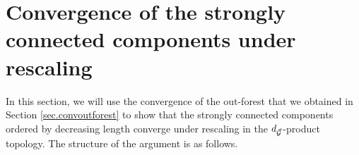 \section{Convergence of the strongly connected components under rescaling}\label{sec.convSCCs}

In this section, we will use the convergence of the out-forest that we obtained in Section \ref{sec.convoutforest} to show that the strongly connected components ordered by decreasing length converge under rescaling in the $d_{\vec{{\mathcal G}}}$-product topology. The structure of the argument is as follows. 


